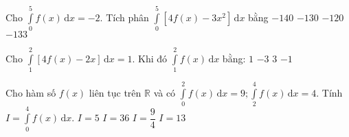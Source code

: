 \begin{ex}%
	Cho $\displaystyle\int\limits_0^5f(x)\mathrm{\,d}x=-2$. Tích phân $\displaystyle\int\limits_0^5\left[4f(x)-3x^2\right]\mathrm{\,d}x$ bằng
	\choice
	{$-140$}
	{$-130$}
	{$-120$}
	{\True $-133$}
\end{ex}
\begin{ex}%
	Cho $\displaystyle\int\limits_1^2\left[4f(x)-2x\right]\mathrm{\,d}x=1$. Khi đó $\displaystyle\int\limits_1^2f(x)\mathrm{\,d}x$ bằng:
	\choice
	{\True $1$}
	{$-3$}
	{$3$}
	{$-1$}
\end{ex}
\begin{ex}%
	Cho hàm số $f(x)$ liên tục trên $\mathbb{R}$ và có $\displaystyle\int\limits_0^2f(x)\mathrm{\,d}x=9;\displaystyle\int\limits_2^4f(x)\mathrm{\,d}x=4$. Tính $I=\displaystyle\int\limits_0^4f(x)\mathrm{\,d}x$.
	\choice
	{$I=5$}
	{$I=36$}
	{$I=\dfrac{9}{4}$}
	{\True $I=13$}
\end{ex}
